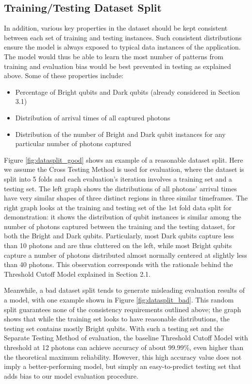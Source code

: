 \documentclass[letterpaper,twocolumn,10pt]{article}
\begin{document}
\subsection{Training/Testing Dataset Split}

In addition, various key properties in the dataset should be kept consistent between each set of training and testing instances. Such consistent distributions ensure the model is always exposed to typical data instances of the application. The model would thus be able to learn the most number of patterns from training and evaluation bias would be best prevented in testing as explained above. Some of these properties include:

\begin{itemize}
    \item Percentage of Bright qubits and Dark qubits (already considered in Section 3.1)
    \item Distribution of arrival times of all captured photons
    \item Distribution of the number of Bright and Dark qubit instances for any particular number of photons captured
\end{itemize}

Figure \ref{fig:datasplit_good} shows an example of a reasonable dataset split. Here we assume the Cross Testing Method is used for evaluation, where the dataset is split into 5 folds and each evaluation's iteration involves a training set and a testing set. The left graph shows the distributions of all photons' arrival times have very similar shapes of three distinct regions in three similar timeframes. The right graph looks at the training and testing set of the 1st fold data split for demonstration: it shows the distribution of qubit instances is similar among the number of photons captured between the training and the testing dataset, for both the Bright and Dark qubits. Particularly, most Dark qubits capture less than 10 photons and are thus cluttered on the left, while most Bright qubits capture a number of photons distributed almost normally centered at slightly less than 40 photons. This observation corresponds with the rationale behind the Threshold Cutoff Model explained in Section 2.1. 

Meanwhile, a bad dataset split tends to generate misleading evaluation results of a model, with one example shown in Figure \ref{fig:datasplit_bad}. This random split guarantees none of the consistency requirements outlined above; the graph shows that while the training set looks to have reasonable distributions, the testing set contains mostly Bright qubits. With such a testing set and the Separate Testing Method of evaluation, the baseline Threshold Cutoff Model with threshold at 12 photons can achieve accuracy of about 99.99\%, even higher than the theoretical maximum reliability. However, this high accuracy value does not imply a better-performing model, but simply an easy-to-predict testing set that adds bias to our model evaluation procedure.
\end{document}
